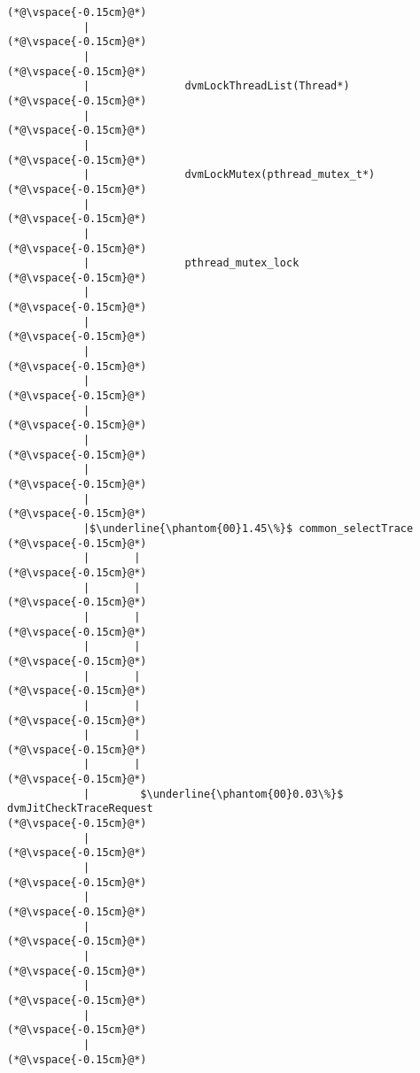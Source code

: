 \begin{lstlisting}[caption=20 viiteparametria Java$\to$C , label=profile:J2CBenchmark00206, numberbychapter=true, frame=lines, float, floatplacement=t]
(*@\vspace{-0.15cm}@*)
            |          
(*@\vspace{-0.15cm}@*)
            |          
(*@\vspace{-0.15cm}@*)
            |               dvmLockThreadList(Thread*)
(*@\vspace{-0.15cm}@*)
            |         
(*@\vspace{-0.15cm}@*)
            |         
(*@\vspace{-0.15cm}@*)
            |               dvmLockMutex(pthread_mutex_t*)
(*@\vspace{-0.15cm}@*)
            |             
(*@\vspace{-0.15cm}@*)
            |             
(*@\vspace{-0.15cm}@*)
            |               pthread_mutex_lock
(*@\vspace{-0.15cm}@*)
            |
(*@\vspace{-0.15cm}@*)
            |
(*@\vspace{-0.15cm}@*)
            |
(*@\vspace{-0.15cm}@*)
            |
(*@\vspace{-0.15cm}@*)
            |
(*@\vspace{-0.15cm}@*)
            |
(*@\vspace{-0.15cm}@*)
            |
(*@\vspace{-0.15cm}@*)
            |
(*@\vspace{-0.15cm}@*)
            |$\underline{\phantom{00}1.45\%}$ common_selectTrace
(*@\vspace{-0.15cm}@*)
            |       |
(*@\vspace{-0.15cm}@*)
            |       |
(*@\vspace{-0.15cm}@*)
            |       |
(*@\vspace{-0.15cm}@*)
            |       |
(*@\vspace{-0.15cm}@*)
            |       |
(*@\vspace{-0.15cm}@*)
            |       |
(*@\vspace{-0.15cm}@*)
            |       |
(*@\vspace{-0.15cm}@*)
            |       |
(*@\vspace{-0.15cm}@*)
            |        $\underline{\phantom{00}0.03\%}$ dvmJitCheckTraceRequest
(*@\vspace{-0.15cm}@*)
            |
(*@\vspace{-0.15cm}@*)
            |
(*@\vspace{-0.15cm}@*)
            |
(*@\vspace{-0.15cm}@*)
            |
(*@\vspace{-0.15cm}@*)
            |
(*@\vspace{-0.15cm}@*)
            |
(*@\vspace{-0.15cm}@*)
            |
(*@\vspace{-0.15cm}@*)
            |
(*@\vspace{-0.15cm}@*)



\end{lstlisting}

